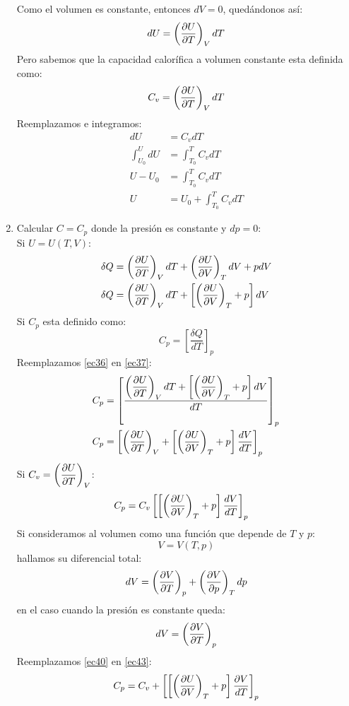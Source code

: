 \documentclass[../main]{subfiles}
\begin{document}
\begin{enumerate}
    Como el volumen es constante, entonces $dV=0$, quedándonos así:
    \begin{equation}
        dU=\left( \pdv{U}{T} \right)_V dT
    \end{equation}
    Pero sabemos que la capacidad calorífica a volumen constante esta definida como:
    \begin{equation}
        C_v=\left( \pdv{U}{T} \right)_V dT
    \end{equation}
    Reemplazamos e integramos:
    \begin{align*}
        dU&=C_v dT \\
        \int_{U_0}^{U} dU&=\int_{T_0}^T C_v dT \\
        U-U_0&=\int_{T_0}^T C_v dT \\
        U&=U_0+\int_{T_0}^T C_v dT
    \end{align*}
    \item Calcular $C=C_p$ donde la presión es constante y $dp=0$:\\
    Si $U=U(T,V)$:
    \begin{align}
        \delta Q&=\left(\pdv{U}{T}\right)_V dT+\left( \pdv{U}{V}\right)_T dV+pdV \\
        \delta Q&=\left(\pdv{U}{T}\right)_V dT+\left[\left( \pdv{U}{V}\right)_T+p\right]dV
        \label{ec36}
    \end{align}
    Si $C_p$ esta definido como:
    \begin{equation}
        C_p=\left[ \dfrac{\delta Q}{dT}\right]_p
        \label{ec37}
    \end{equation}
    Reemplazamos \eqref{ec36} en \eqref{ec37}:
    \begin{align}
        C_p&=\left[ \dfrac{ \displaystyle \left(\pdv{U}{T}\right)_V dT+\left[\left( \pdv{U}{V}\right)_T+p\right]dV}{dT}\right]_p \\
        C_p&=\left[ \left(\pdv{U}{T}\right)_V+\left[\left(\pdv{U}{V}\right)_T+p\right]\dfrac{dV}{dT}\right]_p
    \end{align}
    Si $\displaystyle C_v=\left( \pdv{U}{T}\right)_V$:
    \begin{align}
        C_p&=C_v\left[ \left[\left(\pdv{U}{V}\right)_T+p\right]\dfrac{dV}{dT}\right]_p
        \label{ec40}
    \end{align}
    Si consideramos al volumen como una función que depende de $T$ y $p$:
    \begin{equation}
        V=V(T,p)
    \end{equation}
    hallamos su diferencial total:
    \begin{align}
        dV=\left(\pdv{V}{T}\right)_p+\left(\pdv{V}{p}\right)_T dp
    \end{align}
    en el caso cuando la presión es constante queda:
    \begin{equation}
        dV=\left( \pdv{V}{T}\right)_p
        \label{ec43}
    \end{equation}
    Reemplazamos \eqref{ec40} en \eqref{ec43}:
    \begin{equation}
        C_p=C_v+\left[ \left[\left(\pdv{U}{V}\right)_T+p\right]\dfrac{\partial V}{dT}\right]_p
    \end{equation}
\end{enumerate}
\end{document}

